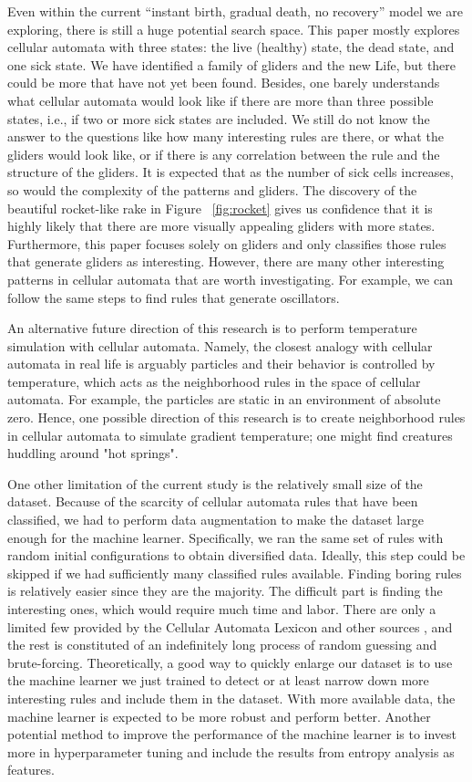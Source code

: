 \documentclass[12pt]{article}
\numberwithin{figure}{section} %
\begin{document}
Even within the current “instant birth, gradual death, no recovery” model we are exploring, there is still a huge potential search space. This paper mostly explores cellular automata with three states: the live (healthy) state, the dead state, and one sick state. We have identified a family of gliders and the new Life, but there could be more that have not yet been found. Besides, one barely understands what cellular automata would look like if there are more than three possible states, i.e., if two or more sick states are included. We still do not know the answer to the questions like how many interesting rules are there, or what the gliders would look like, or if there is any correlation between the rule and the structure of the gliders. It is expected that as the number of sick cells increases, so would the complexity of the patterns and gliders. The discovery of the beautiful rocket-like rake in Figure ~\ref{fig:rocket} gives us confidence that it is highly likely that there are more visually appealing gliders with more states. Furthermore, this paper focuses solely on gliders and only classifies those rules that generate gliders as interesting. However, there are many other interesting patterns in cellular automata that are worth investigating. For example, we can follow the same steps to find rules that generate oscillators. 

An alternative future direction of this research is to perform temperature simulation with cellular automata. Namely, the closest analogy with cellular automata in real life is arguably particles and their behavior is controlled by temperature, which acts as the neighborhood rules in the space of cellular automata. For example, the particles are static in an environment of absolute zero. Hence, one possible direction of this research is to create neighborhood rules in cellular automata to simulate gradient temperature; one might find creatures huddling around "hot springs". 

One other limitation of the current study is the relatively small size of the dataset. Because of the scarcity of cellular automata rules that have been classified, we had to perform data augmentation to make the dataset large enough for the machine learner. Specifically, we ran the same set of rules with random initial configurations to obtain diversified data. Ideally, this step could be skipped if we had sufficiently many classified rules available. Finding boring rules is relatively easier since they are the majority. The difficult part is finding the interesting ones, which would require much time and labor. There are only a limited few provided by the Cellular Automata Lexicon and other sources \cite{Lexicon}, and the rest is constituted of an indefinitely long process of random guessing and brute-forcing. Theoretically, a good way to quickly enlarge our dataset is to use the machine learner we just trained to detect or at least narrow down more interesting rules and include them in the dataset. With more available data, the machine learner is expected to be more robust and perform better. Another potential method to improve the performance of the machine learner is to invest more in hyperparameter tuning and include the results from entropy analysis as features. 
\end{document}
